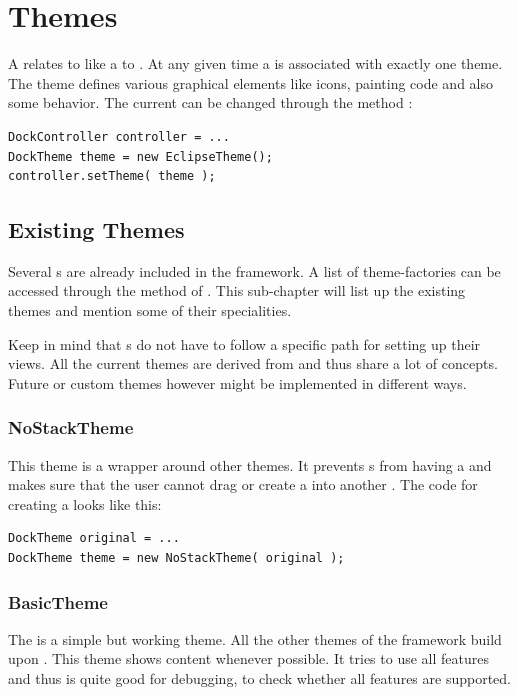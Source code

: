 \section{Themes}
A  relates to  like a  to . At any given time a  is associated with exactly one theme. The theme defines various graphical elements like icons, painting code and also some behavior. The current  can be changed through the method :
\begin{lstlisting}
DockController controller = ...
DockTheme theme = new EclipseTheme();
controller.setTheme( theme );
\end{lstlisting}

\subsection{Existing Themes}
Several s are already included in the framework. A list of theme-factories can be accessed through the method  of . This sub-chapter will list up the existing themes and mention some of their specialities.

Keep in mind that s do not have to follow a specific path for setting up their views. All the current themes are derived from  and thus share a lot of concepts. Future or custom themes however might be implemented in different ways.

\subsubsection{NoStackTheme}
This theme is a wrapper around other themes. It prevents s from having a  and makes sure that the user cannot drag or create a  into another . The code for creating a  looks like this:
\begin{lstlisting}
DockTheme original = ...
DockTheme theme = new NoStackTheme( original );
\end{lstlisting}

\subsubsection{BasicTheme}
The  is a simple but working theme. All the other themes of the framework build upon . This theme shows content whenever possible. It tries to use all features and thus is quite good for debugging, to check whether all features are supported.


